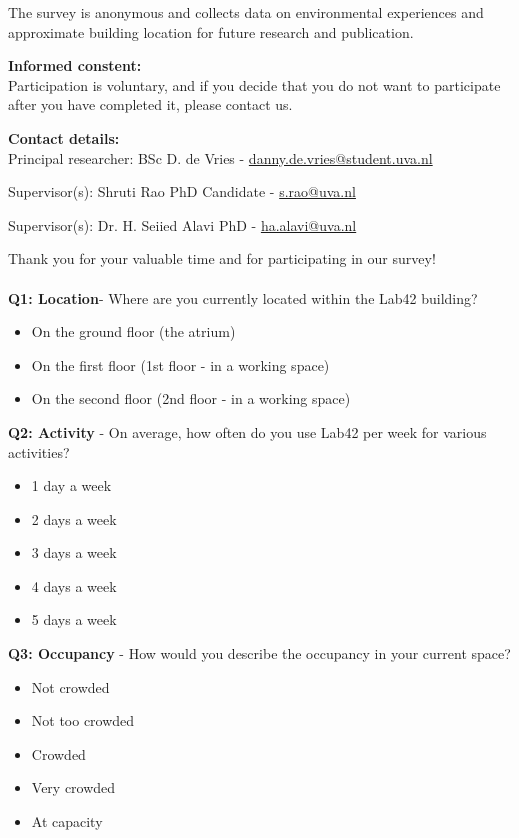 \begin{appendices}
The survey is anonymous and collects data on environmental experiences and approximate building location for future research and publication.

\textbf{Informed constent:}\\
Participation is voluntary, and if you decide that you do not want to participate after you have completed it, please contact us.

\textbf{Contact details:}\\
Principal researcher: BSc D. de Vries - \href{mailto:danny.de.vries@student.uva.nl}{danny.de.vries@student.uva.nl}

Supervisor(s): Shruti Rao PhD Candidate - \href{mailto:s.rao@uva.nl}{s.rao@uva.nl}

Supervisor(s): Dr. H. Seiied Alavi PhD - \href{mailto:ha.alavi@uva.nl}{ha.alavi@uva.nl}

Thank you for your valuable time and for participating in our survey!\\\\

\textbf{Q1: Location}- Where are you currently located within the Lab42 building?

\begin{itemize}
    \item On the ground floor (the atrium)
    \item On the first floor (1st floor - in a working space)
    \item On the second floor (2nd floor - in a working space)
\end{itemize}

\textbf{Q2: Activity} - On average, how often do you use Lab42 per week for various activities?

\begin{itemize}
    \item 1 day a week
    \item 2 days a week
    \item 3 days a week
    \item 4 days a week
    \item 5 days a week
\end{itemize}

\textbf{Q3: Occupancy} - How would you describe the occupancy in your current space?

\begin{itemize}
    \item Not crowded
    \item Not too crowded
    \item Crowded
    \item Very crowded
    \item At capacity
\end{itemize}


\end{appendices}
